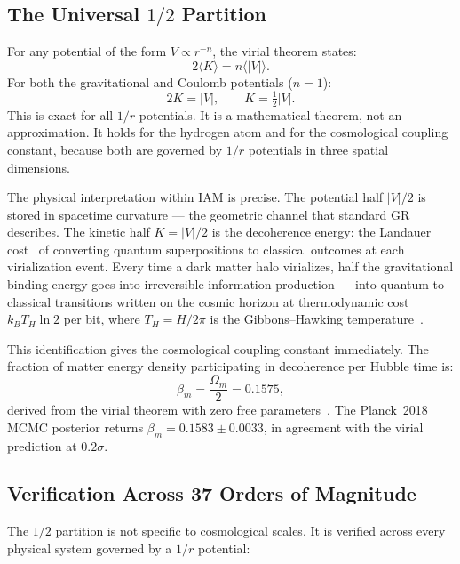 \documentclass[12pt,a4paper]{article}
\begin{document}
\subsection{The Universal $1/2$ Partition}

For any potential of the form $V \propto r^{-n}$, the virial theorem states:
\begin{equation}
2\langle K \rangle = n\langle |V| \rangle.
\label{eq:virial_general}
\end{equation}
For both the gravitational and Coulomb potentials ($n = 1$):
\begin{equation}
2K = |V|, \qquad K = \tfrac{1}{2}|V|.
\label{eq:virial}
\end{equation}
This is exact for all $1/r$ potentials. It is a mathematical theorem, not
an approximation. It holds for the hydrogen atom and for the cosmological
coupling constant, because both are governed by $1/r$ potentials in three
spatial dimensions.

The physical interpretation within IAM is precise. The potential half $|V|/2$
is stored in spacetime curvature --- the geometric channel that standard GR
describes. The kinetic half $K = |V|/2$ is the decoherence energy: the
Landauer cost~\citep{Landauer1961} of converting quantum superpositions to
classical outcomes at each virialization event. Every time a dark matter halo
virializes, half the gravitational binding energy goes into irreversible
information production --- into quantum-to-classical transitions written on the
cosmic horizon at thermodynamic cost $k_B T_H \ln 2$ per bit, where $T_H =
H/2\pi$ is the Gibbons--Hawking temperature~\citep{Gibbons1977}.

This identification gives the cosmological coupling constant immediately.
The fraction of matter energy density participating in decoherence per Hubble
time is:
\begin{equation}
\beta_m = \frac{\Omega_m}{2} = 0.1575,
\label{eq:beta}
\end{equation}
derived from the virial theorem with zero free parameters~\citep{IAM_theory}.
The Planck~2018 MCMC posterior returns $\beta_m = 0.1583 \pm 0.0033$, in
agreement with the virial prediction at $0.2\sigma$.

\subsection{Verification Across 37 Orders of Magnitude}

The $1/2$ partition is not specific to cosmological scales. It is verified
across every physical system governed by a $1/r$ potential:
\end{document}
